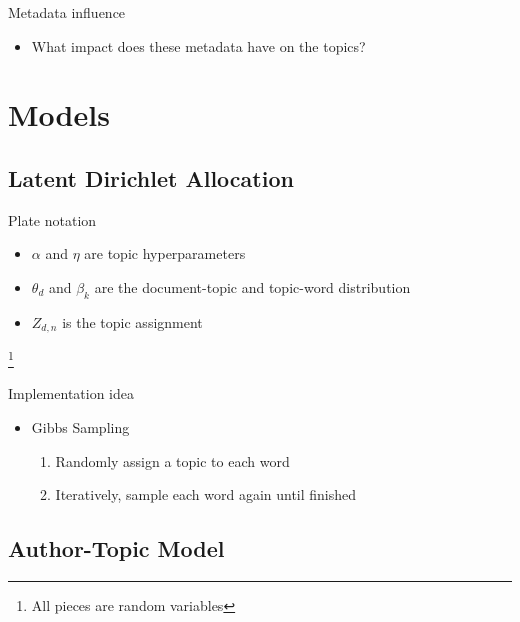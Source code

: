 \begin{frame}{\insertsection}{Metadata influence}
	\begin{itemize}
		\item What impact does these metadata have on the topics?
	\end{itemize}
\end{frame}

\section{Models}

\subsection{Latent Dirichlet Allocation}

\begin{frame}{\insertsubsection}{Plate notation}
	\begin{figure}
		\centering
		\resizebox{\textwidth}{!}{%
			
		}
	\end{figure}
	\begin{itemize}
		\item $\alpha$ and $\eta$ are topic hyperparameters
		\item $\theta_d$ and $\beta_k$ are the document-topic and topic-word distribution
		\item $Z_{d,n}$ is the topic assignment 
	\end{itemize}
	\let\thefootnote\relax\footnote{\tiny{All pieces are random variables}}
\end{frame}


\begin{frame}{\insertsubsection}{Implementation idea}
	\begin{itemize}
		\item Gibbs Sampling
		\begin{enumerate}
			\item Randomly assign a topic to each word
			\item Iteratively, sample each word again until finished 
		\end{enumerate}
	\end{itemize}
\end{frame}

\subsection{Author-Topic Model}

